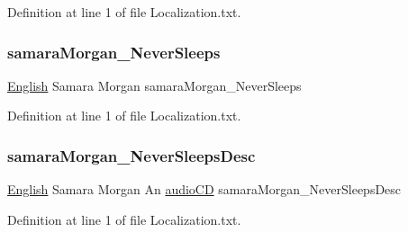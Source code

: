 Definition at line 1 of file Localization.\+txt.

\mbox{\label{_the_01_restless_01_curse_2_config_2_localization_8txt_a9a46a47148ce30e2f09c946a4e9bd88a}} 
\subsubsection{\texorpdfstring{samaraMorgan\_NeverSleeps}{samaraMorgan\_NeverSleeps}}
{\footnotesize\ttfamily \mbox{\hyperlink{_sphere_i_i_01_winter_01_project_2_config_2_localization_8txt_ad896b63205779b1b09e86d941ce13976}{English}} Samara Morgan samara\+Morgan\+\_\+\+Never\+Sleeps}



Definition at line 1 of file Localization.\+txt.

\mbox{\label{_the_01_restless_01_curse_2_config_2_localization_8txt_ab80fa8fe6da47f7bd0f02427da5f36c8}} 
\subsubsection{\texorpdfstring{samaraMorgan\_NeverSleepsDesc}{samaraMorgan\_NeverSleepsDesc}}
{\footnotesize\ttfamily \mbox{\hyperlink{_sphere_i_i_01_winter_01_project_2_config_2_localization_8txt_ad896b63205779b1b09e86d941ce13976}{English}} Samara Morgan An \mbox{\hyperlink{_sphere_i_i_01_music_01_boxes_2_config_2_localization_8txt_ae0a4281bb52a78c638f75d315de5da12}{audio\+CD}} samara\+Morgan\+\_\+\+Never\+Sleeps\+Desc}



Definition at line 1 of file Localization.\+txt.

\mbox{\label{_the_01_restless_01_curse_2_config_2_localization_8txt_a176e1eca2d1e3d1c6a064340bc6a351e}} 
